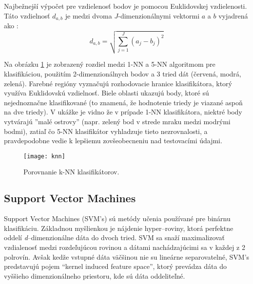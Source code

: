 Najbežnejší výpočet pre vzdielenosť bodov je pomocou Euklidovskej vzdielenosti.
Táto vzdielnosť $d_{a,b}$ je medzi dvoma $J$-dimenzionálnymi vektormi $a$ a $b$ vyjadrená ako \cite{prop:KnnClassification}:
\begin{equation}
    \label{eq:euclidMetric}
    d_{a,b} = \sqrt{\sum_{j=1}^{J}{(a_j - b_j)^2}}
\end{equation}

Na obrázku \ref{pic:kNN} je zobrazený rozdiel medzi 1-NN a 5-NN algoritmom pre klasifikáciou,
    použitím 2-dimenzionálnych bodov a 3 tried dát (červená, modrá, zelená).
Farebné regióny vyznačujú rozhodovacie hranice klasifikátora, ktorý využíva Euklidovskú vzdielnosť.
Biele oblasti ukazujú body, ktoré sú nejednoznačne klasifikované (to znamená, že hodnotenie triedy je viazané aspoň na dve triedy).
V ukážke je vidno že v prípade 1-NN klasifikátora, niektré body vytvárajú ''malé ostrovy''
    (napr. zelený bod v strede mraku medzi modrými bodmi), zatiaľ čo 5-NN klasifikátor vyhladzuje tieto nezrovnalosti,
    a pravdepodobne vedie k lepšiemu zovšeobecneniu nad testovacími údajmi.

\begin{figure}[H]
	\centering
	\texttt{[image: knn]}
	\caption{Porovnanie k-NN klasifikátorov\cite{odkaz:KnnImage}.}
	\label{pic:kNN}
\end{figure}



\subsection{Support Vector Machines}
Support Vector Machines (SVM's) sú metódy učenia používané pre binárnu klasifikáciu.
Základnou myšlienkou je nájdenie hyper--roviny, ktorá perfektne oddelí \textit{d}--dimenzionálne dáta do dvoch tried\cite{prop:IntroductionToSVM}.
SVM sa snaží maximalizovať vzdialenosť medzi rozdeľujúcou rovinou a dátami nachádzajúcimi sa v každej z 2 polrovín\cite{prop:SupervisedMachineLearning}.
Avšak kedže vstupné dáta väčšinou nie su lineárne separovatelné, SVM's predstavujú pojem “kernel induced feature space”,
    ktorý prevádza dáta do vyššieho dimenzionálneho priestoru, kde sú dáta oddeliteľné.\cite{prop:IntroductionToSVM}


